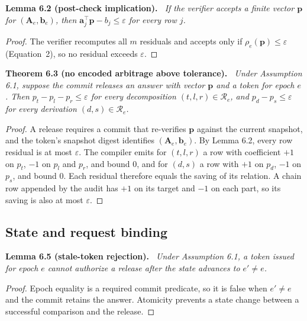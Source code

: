 \documentclass[10pt]{article}
\newcommand{\tol}{\varepsilon}
\newcommand{\pvec}{\mathbf{p}}
\newcommand{\Amat}{\mathbf{A}}
\newcommand{\bvec}{\mathbf{b}}
\newcommand{\avec}{\mathbf{a}}
\newcommand{\relset}{\mathcal{R}}
\newenvironment{paperstatement}[1]{\par\medskip\noindent\textbf{#1.}\itshape\ }{\par\medskip}
\begin{document}
\begin{paperstatement}{Lemma 6.2 (post-check implication)}
If the verifier accepts a finite vector $\pvec$ for $(\Amat_e,\bvec_e)$, then $\avec_j^{\top}\pvec - b_j \le \tol$ for every row $j$.
\end{paperstatement}
\begin{proof}
The verifier recomputes all $m$ residuals and accepts only if $\rho_e(\pvec) \le \tol$ (Equation~2), so no residual exceeds $\tol$.
\end{proof}

\begin{paperstatement}{Theorem 6.3 (no encoded arbitrage above tolerance)}
Under Assumption 6.1, suppose the commit releases an answer with vector $\pvec$ and a token for epoch $e$. Then $p_t - p_l - p_r \le \tol$ for every decomposition $(t,l,r) \in \relset_e$, and $p_d - p_s \le \tol$ for every derivation $(d,s) \in \relset_e$.
\end{paperstatement}
\begin{proof}
A release requires a commit that re-verifies $\pvec$ against the current snapshot, and the token's snapshot digest identifies $(\Amat_e,\bvec_e)$. By Lemma 6.2, every row residual is at most $\tol$. The compiler emits for $(t,l,r)$ a row with coefficient $+1$ on $p_t$, $-1$ on $p_l$ and $p_r$, and bound 0, and for $(d,s)$ a row with $+1$ on $p_d$, $-1$ on $p_s$, and bound 0. Each residual therefore equals the saving of its relation. A chain row appended by the audit has $+1$ on its target and $-1$ on each part, so its saving is also at most $\tol$.
\end{proof}

\subsection{State and request binding}

\begin{paperstatement}{Lemma 6.5 (stale-token rejection)}
Under Assumption 6.1, a token issued for epoch $e$ cannot authorize a release after the state advances to $e' \ne e$.
\end{paperstatement}
\begin{proof}
Epoch equality is a required commit predicate, so it is false when $e' \ne e$ and the commit retains the answer. Atomicity prevents a state change between a successful comparison and the release.
\end{proof}
\end{document}
